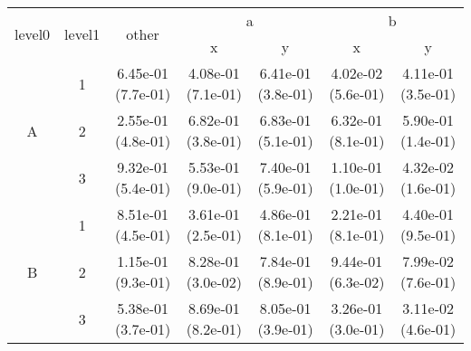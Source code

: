 \begin{tabular}{ccccccc}
\toprule
\multirow{2}{*}{level0} & \multirow{2}{*}{level1}& \multirow{2}{*}{other}&\multicolumn{2}{c}{a}&\multicolumn{2}{c}{b}\tabularnewline
\cmidrule(lr){4-5}
\cmidrule(lr){6-7}
&&&x&y&x&y\tabularnewline
\midrule
\multirow{3}{*}{A}&1& 6.45e-01 (7.7e-01)& 4.08e-01 (7.1e-01)& 6.41e-01 (3.8e-01)& 4.02e-02 (5.6e-01)& 4.11e-01 (3.5e-01)\tabularnewline
&2& 2.55e-01 (4.8e-01)& 6.82e-01 (3.8e-01)& 6.83e-01 (5.1e-01)& 6.32e-01 (8.1e-01)& 5.90e-01 (1.4e-01)\tabularnewline
&3& 9.32e-01 (5.4e-01)& 5.53e-01 (9.0e-01)& 7.40e-01 (5.9e-01)& 1.10e-01 (1.0e-01)& 4.32e-02 (1.6e-01)\tabularnewline
\midrule
\multirow{3}{*}{B}&1& 8.51e-01 (4.5e-01)& 3.61e-01 (2.5e-01)& 4.86e-01 (8.1e-01)& 2.21e-01 (8.1e-01)& 4.40e-01 (9.5e-01)\tabularnewline
&2& 1.15e-01 (9.3e-01)& 8.28e-01 (3.0e-02)& 7.84e-01 (8.9e-01)& 9.44e-01 (6.3e-02)& 7.99e-02 (7.6e-01)\tabularnewline
&3& 5.38e-01 (3.7e-01)& 8.69e-01 (8.2e-01)& 8.05e-01 (3.9e-01)& 3.26e-01 (3.0e-01)& 3.11e-02 (4.6e-01)\tabularnewline
\bottomrule
\end{tabular}
